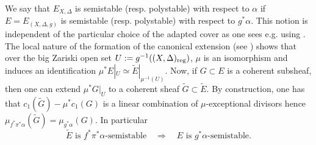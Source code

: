 \documentclass[12pt]{amsart}
\theoremstyle{definition}
\newcommand{\tE}{\widetilde{E}}
\numberwithin{equation}{section}
\begin{document}
We say that $E_{X,\Delta}$ is semistable (resp. polystable) with respect to $\alpha$ if $E=E_{(X,\Delta,g)}$ is semistable (resp. polystable) with respect to $g^*\alpha$. This notion is independent of the particular choice of the adapted cover as one sees e.g. using \cite[Lemmas~3.2.2 and 3.2.3]{HL-book-sheaf}. The local nature of the formation of the canonical extension (see \cite[Remark~7]{DGP-Q-Fano-decomp}) shows that over the big Zariski open set $U:=g^{-1}((X,\Delta)_{\rm reg})$, $\mu$ is an isomorphism and induces an identification $\mu^*E|_U\simeq \tE|_{\mu^{-1}(U)}$. Now, if $G\subset E$ is a coherent subsheaf, then one can extend $\mu^*G|_U$ to a coherent sheaf $\tilde G \subset \tE$. By construction, one has that $c_1(\tilde G)-\mu^*c_1(G)$ is a linear combination of $\mu$-exceptional divisors hence $\mu_{f^*\pi^*\alpha}(\tilde G)=\mu_{g^*\alpha}(G)$. In particular
\begin{equation}
\label{ss}
\tE \,\, \mbox{is} \,\, f^*\pi^*\alpha \mbox{-semistable} \quad \Longrightarrow \quad E\,\, \mbox{is} \,\, g^*\alpha \mbox{-semistable}.
\end{equation}
\end{document}
